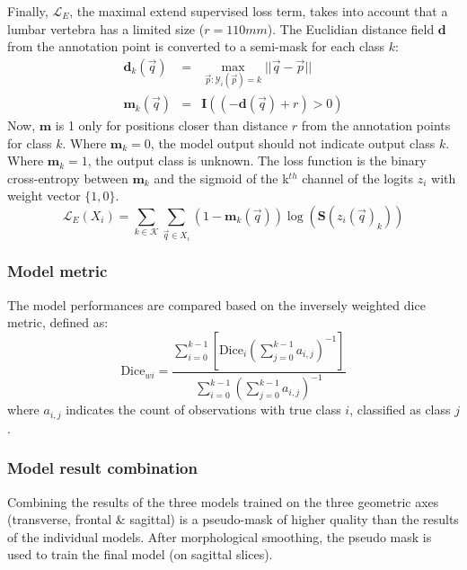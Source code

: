 \begin{multicols}{2}
\begin{equation}
\end{equation}
\par{
    Finally, $\mathcal{L}_E$, the maximal extend supervised loss term, takes into account that a lumbar vertebra has a limited size ($r=110mm$).
    The Euclidian distance field $\mathbf{d}$ from the annotation point is converted to a semi-mask for each class $k$:
    \begin{eqnarray}
        \mathbf{d}_k(\vec{q}) &=& \max_{\vec{p}:\mathcal{Y}_i(\vec{p})=k}||\vec{q} - \vec{p}||\\
        \mathbf{m}_k(\vec{q}) &=& \mathbf{I}\left( (-\mathbf{d}(\vec{q}) + r) > 0 \right)
    \end{eqnarray}
    Now, $\mathbf{m}$ is 1 only for positions closer than distance $r$ from the annotation points for class $k$.
    Where $\mathbf{m}_k=0$, the model output should not indicate output class $k$. Where $\mathbf{m}_k=1$, the output class is unknown.
    The loss function is the binary cross-entropy between $\mathbf{m}_k$ and the sigmoid of the k$^{th}$ channel of the logits $z_i$ with weight vector $\{1, 0\}$.
}
\begin{equation}
    \mathcal{L}_E(X_i) = \sum_{k\in\mathcal{K}}\sum_{\vec{q}\in X_i}  (1-\mathbf{m}_k(\vec{q})) \log(\mathbf{S}(z_i(\vec{q})_k)) 
\end{equation}

\subsubsection*{Model metric}
The model performances are compared based on the inversely weighted dice metric, defined as:
\begin{equation}
    \text{Dice}_{wi} = \frac{\sum_{i=0}^{k-1} \left[ \text{Dice}_i \left( \sum_{j=0}^{k-1} a_{i,j} \right)^{-1} \right] }{\sum_{i=0}^{k-1} \left(\sum_{j=0}^{k-1} a_{i,j} \right)^{-1}} \label{eq:weighted_dice}
\end{equation}
where $a_{i,j}$ indicates the count of observations with true class $i$, classified as class $j$.

\subsubsection*{Model result combination}
\par{
    Combining the results of the three models trained on the three geometric axes (transverse, frontal \& sagittal) is a pseudo-mask of higher quality than the results of the individual models.
    After morphological smoothing, the pseudo mask is used to train the final model (on sagittal slices).
}
\thispagestyle{plain}

\end{multicols}

